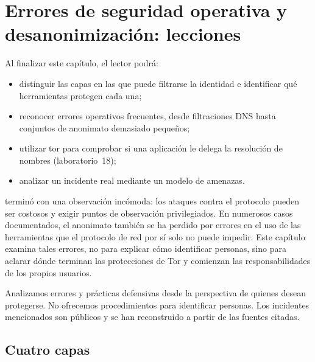 \chapter{Errores de seguridad operativa y desanonimización: lecciones}\label{cap:28-opsec}

\begin{obiettivi}
Al finalizar este capítulo, el lector podrá:
\begin{itemize}[nosep]
  \item distinguir las capas en las que puede filtrarse la identidad e identificar qué herramientas protegen cada una;
  \item reconocer errores operativos frecuentes, desde filtraciones DNS hasta conjuntos de anonimato demasiado pequeños;
  \item utilizar tor para comprobar si una aplicación le delega la resolución de nombres (laboratorio~18);
  \item analizar un incidente real mediante un modelo de amenazas.
\end{itemize}
\end{obiettivi}

 terminó con una observación incómoda: los ataques contra el protocolo pueden ser costosos y exigir puntos de observación privilegiados. En numerosos casos documentados, el anonimato también se ha perdido por errores en el uso de las herramientas que el protocolo de red por sí solo no puede impedir. Este capítulo examina tales errores, no para explicar cómo identificar personas, sino para aclarar dónde terminan las protecciones de Tor y comienzan las responsabilidades de los propios usuarios.

\begin{attenzione}
Analizamos errores y prácticas defensivas desde la perspectiva de quienes desean protegerse. No ofrecemos procedimientos para identificar personas. Los incidentes mencionados son públicos y se han reconstruido a partir de las fuentes citadas.
\end{attenzione}

\section{Cuatro capas}\label{sec:opsec-livelli}

